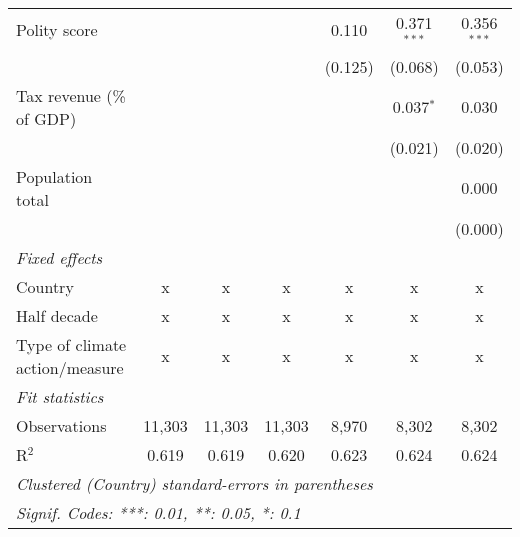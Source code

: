 \begin{tabular}{lcccccc}
   Polity score                                                    &         &               &                & 0.110          & 0.371$^{***}$  & 0.356$^{***}$\\   
                                                                   &         &               &                & (0.125)        & (0.068)        & (0.053)\\   
   Tax revenue (\% of GDP)                                         &         &               &                &                & 0.037$^{*}$    & 0.030\\   
                                                                   &         &               &                &                & (0.021)        & (0.020)\\   
   Population total                                                &         &               &                &                &                & 0.000\\   
                                                                   &         &               &                &                &                & (0.000)\\   
   \emph{Fixed effects}\\
   Country                                                         & x       & x             & x              & x              & x              & x\\  
   Half decade                                                     & x       & x             & x              & x              & x              & x\\  
   Type of climate action/measure                                  & x       & x             & x              & x              & x              & x\\  
   \midrule \emph{Fit statistics}\\
   Observations                                                    & 11,303  & 11,303        & 11,303         & 8,970          & 8,302          & 8,302\\  
   R$^2$                                                           & 0.619   & 0.619         & 0.620          & 0.623          & 0.624          & 0.624\\  
   \midrule
   \multicolumn{7}{l}{\emph{Clustered (Country) standard-errors in parentheses}}\\
   \multicolumn{7}{l}{\emph{Signif. Codes: ***: 0.01, **: 0.05, *: 0.1}}\\
\end{tabular}
\par\endgroup



